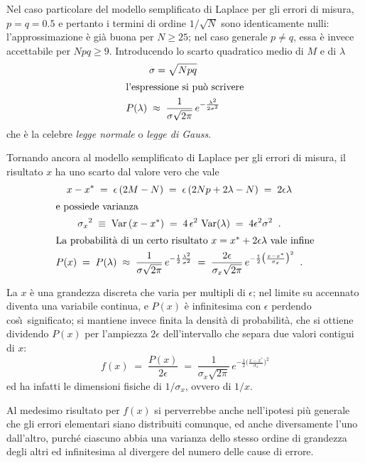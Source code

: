 Nel caso particolare del modello semplificato di Laplace per
gli errori di misura, $p=q=0.5$ e pertanto i termini di
ordine $1/\sqrt{N}$ sono identicamente nulli:
l'approssimazione \`e gi\`a buona per $N \ge 25$; nel caso
generale $p \neq q$, essa \`e invece accettabile per $Npq
\ge 9$.  Introducendo lo scarto quadratico medio di $M$ e di
$\lambda$
\begin{gather*}
  \sigma = \sqrt{Npq} \\
  \intertext{l'espressione si pu\`o scrivere}
  P(\lambda) \; \approx \; \frac{1}{\sigma
    \sqrt{2 \pi}} \, e^{- \frac{\lambda^2}{2 \sigma^2} }
\end{gather*}
che \`e la celebre \emph{legge normale} o \emph{legge di
  Gauss}.

Tornando ancora al modello semplificato di Laplace per gli
errori di misura, il risultato $x$ ha uno scarto dal valore
vero che vale
\begin{gather*}
  x - x^* \; = \;
    \epsilon \, (2M-N) \; = \;
    \epsilon \, (2Np +2\lambda -N) \; = \;
    2 \epsilon \lambda \\
  \intertext{e possiede varianza}
  {\sigma_x}^2 \; \equiv \;
    \operatorname{Var} \left( x - x^* \right) \; = \;
    4 \, \epsilon^2 \, \operatorname{Var} (\lambda) \; = \;
    4 \epsilon^2 \sigma^2 \;\; . \\
  \intertext{La probabilit\`a di un certo
    risultato $x = x^* + 2 \epsilon \lambda $
    vale infine}
  P(x) \; = \; P(\lambda) \; \approx \;
    \frac{1}{\sigma \sqrt{2 \pi} } \,
     e^{- \frac{1}{2}
    \frac{\lambda^2}{\sigma^2}} \; = \;
    \frac{2 \epsilon}{\sigma_x \sqrt{2 \pi}}
    \, e^{- \frac{1}{2} \bigl(
    \frac{x - x^*}{\sigma_x} \bigr) ^2 } \;\; .
\end{gather*}%

La $x$ \`e una grandezza discreta che varia per multipli di
$\epsilon$; nel limite su accennato diventa una variabile
continua, e $P(x)$ \`e infinitesima con $\epsilon$ perdendo
cos\`\i\ significato; si mantiene invece finita la densit\`a
di probabilit\`a, che si ottiene dividendo $P(x)$ per
l'ampiezza $2 \epsilon$ dell'intervallo che separa due
valori contigui di $x$:
\begin{equation*}
  f(x) \; = \;
    \frac{P(x)}{2 \epsilon} \; = \;
    \frac{1}{\sigma_x \sqrt{2 \pi}} \,
    e^{- \frac{1}{2} \bigl(
    \frac{x-x^*}{\sigma_x} \bigr) ^2 }
\end{equation*}
ed ha infatti le dimensioni fisiche di $1/\sigma_x$, ovvero
di $1/x$.

Al medesimo risultato per $f(x)$ si perverrebbe anche
nell'ipotesi pi\`u generale che gli errori elementari siano
distribuiti comunque, ed anche diversamente l'uno
dall'altro, purch\'e ciascuno abbia una varianza dello
stesso ordine di grandezza degli altri ed infinitesima al
divergere del numero delle cause di errore.%

\endinput
